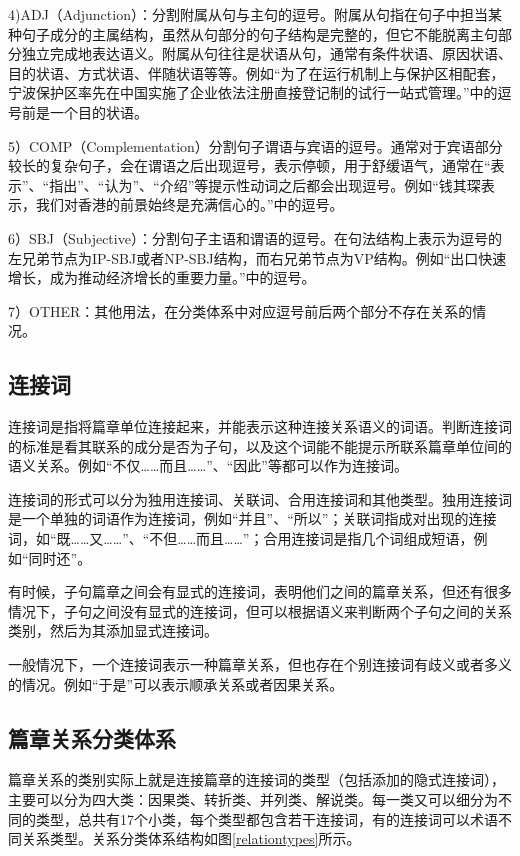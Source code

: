 \documentclass[master, winfont]{njuthesis}
\begin{document}
4)ADJ（Adjunction）：分割附属从句与主句的逗号。附属从句指在句子中担当某种句子成分的主属结构，虽然从句部分的句子结构是完整的，但它不能脱离主句部分独立完成地表达语义。附属从句往往是状语从句，通常有条件状语、原因状语、目的状语、方式状语、伴随状语等等。例如“为了在运行机制上与保护区相配套，宁波保护区率先在中国实施了企业依法注册直接登记制的试行一站式管理。”中的逗号前是一个目的状语。

5）COMP（Complementation）分割句子谓语与宾语的逗号。通常对于宾语部分较长的复杂句子，会在谓语之后出现逗号，表示停顿，用于舒缓语气，通常在“表示”、“指出”、“认为”、“介绍”等提示性动词之后都会出现逗号。例如“钱其琛表示，我们对香港的前景始终是充满信心的。”中的逗号。

6）SBJ（Subjective）：分割句子主语和谓语的逗号。在句法结构上表示为逗号的左兄弟节点为IP-SBJ或者NP-SBJ结构，而右兄弟节点为VP结构。例如“出口快速增长，成为推动经济增长的重要力量。”中的逗号。

7）OTHER：其他用法，在分类体系中对应逗号前后两个部分不存在关系的情况。

\subsection{连接词}
连接词是指将篇章单位连接起来，并能表示这种连接关系语义的词语。判断连接词的标准是看其联系的成分是否为子句，以及这个词能不能提示所联系篇章单位间的语义关系。例如“不仅……而且……”、“因此”等都可以作为连接词。

连接词的形式可以分为独用连接词、关联词、合用连接词和其他类型。独用连接词是一个单独的词语作为连接词，例如“并且”、“所以”；关联词指成对出现的连接词，如“既……又……”、“不但……而且……”；合用连接词是指几个词组成短语，例如“同时还”。

有时候，子句篇章之间会有显式的连接词，表明他们之间的篇章关系，但还有很多情况下，子句之间没有显式的连接词，但可以根据语义来判断两个子句之间的关系类别，然后为其添加显式连接词。

一般情况下，一个连接词表示一种篇章关系，但也存在个别连接词有歧义或者多义的情况。例如“于是”可以表示顺承关系或者因果关系。

\subsection{篇章关系分类体系}
篇章关系的类别实际上就是连接篇章的连接词的类型（包括添加的隐式连接词），主要可以分为四大类：因果类、转折类、并列类、解说类。每一类又可以细分为不同的类型，总共有17个小类，每个类型都包含若干连接词，有的连接词可以术语不同关系类型。关系分类体系结构如图\ref{relationtypes}所示。
\end{document}
